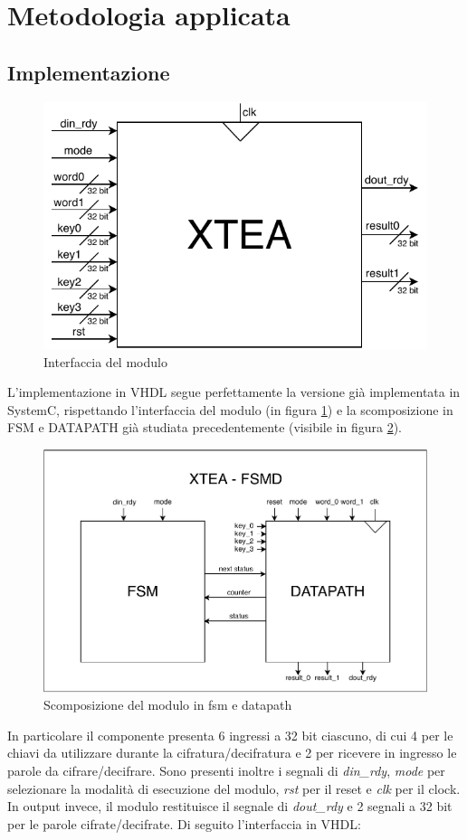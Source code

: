 \documentclass[]{IEEEtran}
\newcommand{\signal}[1]{\textit{#1}}
\begin{document}
\section{Metodologia applicata}
\subsection{Implementazione}
\begin{figure}[bt]
	\centering
	\includegraphics[width=0.6\columnwidth]{figures/xtea}
	\caption{Interfaccia del modulo}
	\label{fig:interf}
\end{figure}
L'implementazione in VHDL segue perfettamente la versione gi\`a implementata in SystemC, rispettando l'interfaccia del
modulo (in figura \ref{fig:interf}) e la scomposizione in FSM e DATAPATH gi\`a studiata precedentemente (visibile in 
figura \ref{fig:fsmd}).
\begin{figure}[bt]
	\centering
	\includegraphics[width=0.9\columnwidth]{figures/fsmd}
	\caption{Scomposizione del modulo in fsm e datapath}
	\label{fig:fsmd}
\end{figure}
In particolare il componente presenta 6 ingressi a 32 bit ciascuno, di cui 4 per le chiavi da utilizzare durante la 
cifratura/decifratura e 2 per ricevere in ingresso le parole da cifrare/decifrare. Sono presenti inoltre i segnali di
\signal{din\_rdy}, \signal{mode} per selezionare la modalit\`a di esecuzione del modulo, \signal{rst} per il reset e 
\signal{clk} per il clock.
In output invece, il modulo restituisce il segnale di \signal{dout\_rdy} e 2 segnali a 32 bit per le parole 
cifrate/decifrate.
Di seguito l'interfaccia in VHDL:
\end{document}
